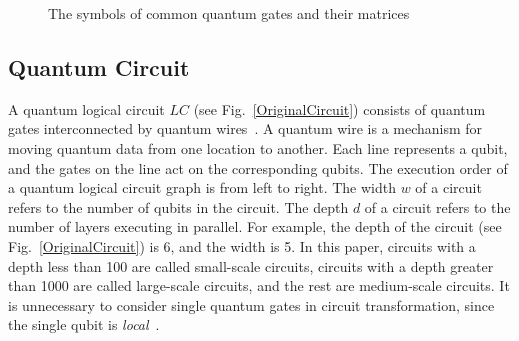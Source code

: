 \documentclass[runningheads]{llncs}
\begin{document}
{\begin{figure}
\begin{center}
\end{center}

\caption{The symbols of common quantum gates and their matrices}\label{common_gates}
\end{figure}	 

}

\subsection{Quantum Circuit}
A quantum logical circuit $LC$ (see Fig.~\ref{OriginalCircuit})
consists of quantum gates interconnected by quantum wires~\cite{Daei2020}.
A quantum wire is a mechanism for moving quantum data from one location to another.
Each line represents a qubit, and the gates on the line act on the corresponding qubits.
The execution order of a quantum logical circuit graph is from left to right.
The width $w$ of a circuit refers to the number of qubits in the circuit.
The depth $d$ of a circuit refers to the number of layers executing in parallel.
For example, the depth of the circuit (see Fig.~\ref{OriginalCircuit}) is 6, and the width is 5.
In this paper, circuits with a depth less than 100 are called small-scale circuits,
circuits with a depth greater than 1000 are called large-scale circuits,
and the rest are medium-scale circuits.
It is unnecessary to consider single quantum gates in circuit transformation, since the single qubit is \emph{local}~\cite{2013Optimization}.
\end{document}
